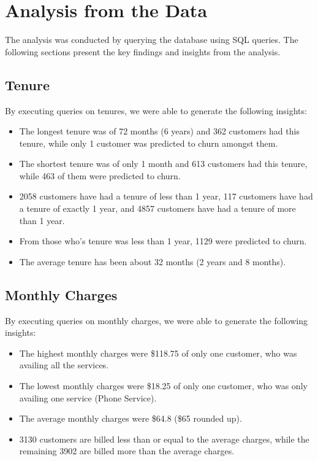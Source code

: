 \documentclass{article}
\theoremstyle{mytheoremstyle}
\theoremstyle{mytheoremstyle}
\theoremstyle{myproblemstyle}
\begin{document}
\newpage
\section{Analysis from the Data}
The analysis was conducted by querying the database using SQL queries. The following sections present the key findings and insights from the analysis.
\subsection{Tenure}
By executing queries on tenures, we were able to generate the following insights:
\begin{itemize}
    \item The longest tenure was of 72 months (6 years) and 362 customers had this tenure, while only 1 customer was predicted to churn amongst them. 
    \item The shortest tenure was of only 1 month and 613 customers had this tenure, while 463 of them were predicted to churn.
    \item 2058 customers have had a tenure of less than 1 year, 117 customers have had a tenure of exactly 1 year, and 4857 customers have had a tenure of more than 1 year.
    \item From those who's tenure was less than 1 year, 1129 were predicted to churn.
    \item The average tenure has been about 32 months (2 years and 8 months).
\end{itemize}

\subsection{Monthly Charges}
By executing queries on monthly charges, we were able to generate the following insights:
\begin{itemize}
    \item The highest monthly charges were \$118.75 of only one customer, who was availing all the services.
    \item The lowest monthly charges were \$18.25 of only one customer, who was only availing one service (Phone Service).
    \item The average monthly charges were \$64.8 (\$65 rounded up).
    \item 3130 customers are billed less than or equal to the average charges, while the remaining 3902 are billed more than the average charges.
\end{itemize}
\end{document}
